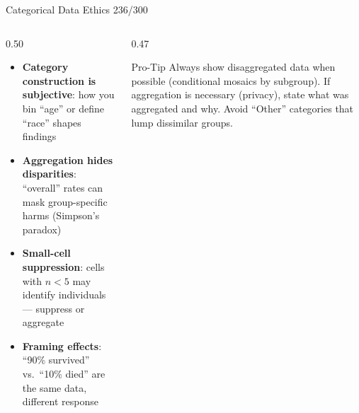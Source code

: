 \documentclass[10pt]{beamer}
\newcommand{\smark}[1]{\hfill{\scriptsize\color{codegray}#1}}
\begin{document}
\begin{frame}{Categorical Data Ethics}
\smark{236/300}
\begin{columns}[T]
\begin{column}{0.50\textwidth}
\begin{itemize}
    \item \textbf{Category construction is subjective}: how you bin ``age'' or define ``race'' shapes findings
    \item \textbf{Aggregation hides disparities}: ``overall'' rates can mask group-specific harms (Simpson's paradox)
    \item \textbf{Small-cell suppression}: cells with $n < 5$ may identify individuals --- suppress or aggregate
    \item \textbf{Framing effects}: ``90\% survived'' vs.\ ``10\% died'' are the same data, different response
\end{itemize}
\end{column}
\begin{column}{0.47\textwidth}
\begin{alertblock}{Pro-Tip}
    \scriptsize Always show disaggregated data when possible (conditional mosaics by subgroup). If aggregation is necessary (privacy), state what was aggregated and why. Avoid ``Other'' categories that lump dissimilar groups.
\end{alertblock}
\end{column}
\end{columns}
\end{frame}
\end{document}
